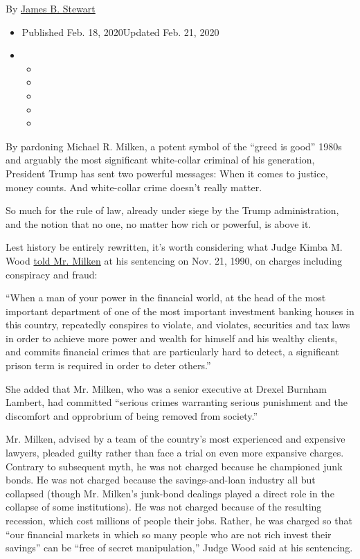 By \href{https://www.nytimes.com/by/james-b-stewart}{James B. Stewart}

\begin{itemize}
\item
  Published Feb. 18, 2020Updated Feb. 21, 2020
\item
  \begin{itemize}
  \item
  \item
  \item
  \item
  \item
  \end{itemize}
\end{itemize}

By pardoning Michael R. Milken, a potent symbol of the ``greed is good''
1980s and arguably the most significant white-collar criminal of his
generation, President Trump has sent two powerful messages: When it
comes to justice, money counts. And white-collar crime doesn't really
matter.

So much for the rule of law, already under siege by the Trump
administration, and the notion that no one, no matter how rich or
powerful, is above it.

Lest history be entirely rewritten, it's worth considering what Judge
Kimba M. Wood
\href{https://www.nytimes.com/1990/11/22/business/milken-sentence-excerpts-judge-wood-s-explanation-milken-sentencing.html}{told
Mr. Milken} at his sentencing on Nov. 21, 1990, on charges including
conspiracy and fraud:

``When a man of your power in the financial world, at the head of the
most important department of one of the most important investment
banking houses in this country, repeatedly conspires to violate, and
violates, securities and tax laws in order to achieve more power and
wealth for himself and his wealthy clients, and commits financial crimes
that are particularly hard to detect, a significant prison term is
required in order to deter others.''

She added that Mr. Milken, who was a senior executive at Drexel Burnham
Lambert, had committed ``serious crimes warranting serious punishment
and the discomfort and opprobrium of being removed from society.''

Mr. Milken, advised by a team of the country's most experienced and
expensive lawyers, pleaded guilty rather than face a trial on even more
expansive charges. Contrary to subsequent myth, he was not charged
because he championed junk bonds. He was not charged because the
savings-and-loan industry all but collapsed (though Mr. Milken's
junk-bond dealings played a direct role in the collapse of some
institutions). He was not charged because of the resulting recession,
which cost millions of people their jobs. Rather, he was charged so that
``our financial markets in which so many people who are not rich invest
their savings'' can be ``free of secret manipulation,'' Judge Wood said
at his sentencing.

